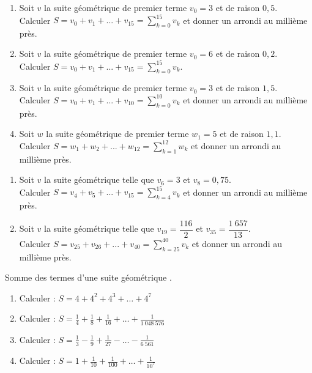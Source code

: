 \documentclass[11pt]{article}
\begin{document}
\begin{exercice}
\begin{multicols}{2}
\begin{enumerate}
\item Soit $v$ la suite géométrique de premier terme $v_0 = 3$ et de
raison $0{,}5$.\\Calculer
$\displaystyle S = v_0 + v_1 + ... + v_{15} =\sum_{k=0}^{15}v_k$ et
donner un arrondi au millième près.
\item Soit $v$ la suite géométrique de premier terme $v_0 = 6$ et de
raison $0{,}2$.\\Calculer
$\displaystyle S = v_0 + v_1 + ... + v_{15} =\sum_{k=0}^{15}v_k$.
\item Soit $v$ la suite géométrique de premier terme $v_0 = 3$ et de
raison $1{,}5$.\\Calculer
$\displaystyle S = v_0 + v_1 + ... + v_{10} =\sum_{k=0}^{10}v_k$ et
donner un arrondi au millième près.
\item Soit $w$ la suite géométrique de premier terme $w_1 = 5$ et de
raison $1{,}1$.\\Calculer
$\displaystyle S = w_1 + w_2 + ... + w_{12} =\sum_{k=1}^{12}w_k$ et
donner un arrondi au millième près.
\end{enumerate}
\end{multicols}
\end{exercice}

\begin{exercice}
\begin{enumerate}
\item Soit $v$ la suite géométrique telle que $v_6 = 3$ et $v_8 =
0,75$.\\
Calculer $\displaystyle S = v_4 + v_5 + ... + v_{15} =\sum_{k=4}^{15}v_k$ et donner un arrondi au millième près.
\item Soit $v$ la suite géométrique telle que $v_{19} = \dfrac{116}{2}$ et $v_{35} = \dfrac{1~657}{13}$.\\
Calculer $\displaystyle S = v_{25} + v_{26} + ... + v_{40}
=\sum_{k=25}^{40}v_k$ et donner un arrondi au millième près.
\end{enumerate}
\end{exercice}

\begin{exercice}
Somme des termes d'une suite géométrique .
\begin{enumerate}
    \item Calculer : \( S = 4 + 4^2 + 4^3 + \dots + 4^7 \)
    \item Calculer : \( S = \frac{1}{4} + \frac{1}{8} + \frac{1}{16} + \dots + \frac{1}{1~048~576} \)
    \item Calculer : \( S = \frac{1}{3} - \frac{1}{9} + \frac{1}{27} - \dots - \frac{1}{6~561} \)
    \item Calculer : \( S = 1 + \frac{1}{10} + \frac{1}{100} + \dots + \frac{1}{10^7} \)
\end{enumerate}
\end{exercice}
\end{document}
